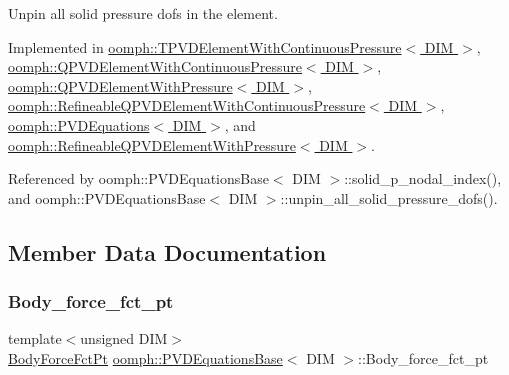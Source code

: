 Unpin all solid pressure dofs in the element. 



Implemented in \hyperlink{classoomph_1_1TPVDElementWithContinuousPressure_a3ca4728b1b91521fa30f008df7eb4549}{oomph\+::\+T\+P\+V\+D\+Element\+With\+Continuous\+Pressure$<$ D\+I\+M $>$}, \hyperlink{classoomph_1_1QPVDElementWithContinuousPressure_a55d0fa7d145270c4b7a8b127b9afe818}{oomph\+::\+Q\+P\+V\+D\+Element\+With\+Continuous\+Pressure$<$ D\+I\+M $>$}, \hyperlink{classoomph_1_1QPVDElementWithPressure_adf9446eb7ed36b39e881d03f006290f8}{oomph\+::\+Q\+P\+V\+D\+Element\+With\+Pressure$<$ D\+I\+M $>$}, \hyperlink{classoomph_1_1RefineableQPVDElementWithContinuousPressure_a7dd0d23afdb19626b2eb1ddfa0dc9612}{oomph\+::\+Refineable\+Q\+P\+V\+D\+Element\+With\+Continuous\+Pressure$<$ D\+I\+M $>$}, \hyperlink{classoomph_1_1PVDEquations_a3ed682fe4a6e0919cc6e0d9445174463}{oomph\+::\+P\+V\+D\+Equations$<$ D\+I\+M $>$}, and \hyperlink{classoomph_1_1RefineableQPVDElementWithPressure_adaf40f1a0ccadd63499e6c555f6b23ee}{oomph\+::\+Refineable\+Q\+P\+V\+D\+Element\+With\+Pressure$<$ D\+I\+M $>$}.



Referenced by oomph\+::\+P\+V\+D\+Equations\+Base$<$ D\+I\+M $>$\+::solid\+\_\+p\+\_\+nodal\+\_\+index(), and oomph\+::\+P\+V\+D\+Equations\+Base$<$ D\+I\+M $>$\+::unpin\+\_\+all\+\_\+solid\+\_\+pressure\+\_\+dofs().



\subsection{Member Data Documentation}
\mbox{\label{classoomph_1_1PVDEquationsBase_a2e578673c31d1afa7fa6f1dc460299ed}} 
\subsubsection{\texorpdfstring{Body\+\_\+force\+\_\+fct\+\_\+pt}{Body\_force\_fct\_pt}}
{\footnotesize\ttfamily template$<$unsigned D\+IM$>$ \\
\hyperlink{classoomph_1_1PVDEquationsBase_aa0d7dc7279aff03dfcc3ad35bb6653be}{Body\+Force\+Fct\+Pt} \hyperlink{classoomph_1_1PVDEquationsBase}{oomph\+::\+P\+V\+D\+Equations\+Base}$<$ D\+IM $>$\+::Body\+\_\+force\+\_\+fct\+\_\+pt\hspace{0.3cm}{\ttfamily [protected]}}



